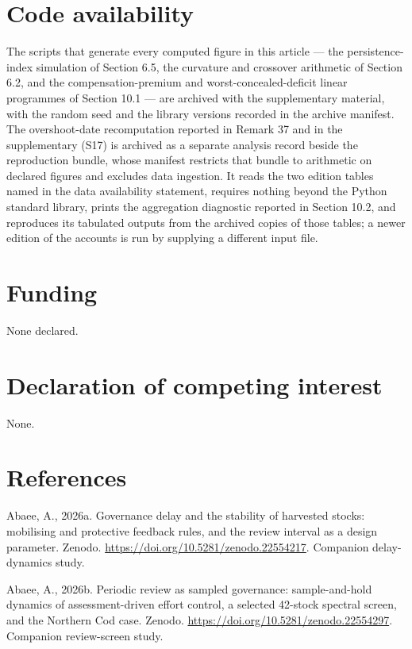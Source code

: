 \documentclass[11pt]{article}
\begin{document}
\section*{Code availability}\label{code-availability}

The scripts that generate every computed figure in this article --- the persistence-index simulation of Section 6.5, the curvature and crossover arithmetic of Section 6.2, and the compensation-premium and worst-concealed-deficit linear programmes of Section 10.1 --- are archived with the supplementary material, with the random seed and the library versions recorded in the archive manifest. The overshoot-date recomputation reported in Remark 37 and in the supplementary (S17) is archived as a separate analysis record beside the reproduction bundle, whose manifest restricts that bundle to arithmetic on declared figures and excludes data ingestion. It reads the two edition tables named in the data availability statement, requires nothing beyond the Python standard library, prints the aggregation diagnostic reported in Section 10.2, and reproduces its tabulated outputs from the archived copies of those tables; a newer edition of the accounts is run by supplying a different input file.

\section*{Funding}\label{funding}

None declared.

\section*{Declaration of competing interest}\label{declaration-of-competing-interest}

None.

\vspace{0.8em}

\section*{References}\label{references}

Abaee, A., 2026a. Governance delay and the stability of harvested stocks: mobilising and protective feedback rules, and the review interval as a design parameter. Zenodo. \url{https://doi.org/10.5281/zenodo.22554217}. Companion delay-dynamics study.

Abaee, A., 2026b. Periodic review as sampled governance: sample-and-hold dynamics of assessment-driven effort control, a selected 42-stock spectral screen, and the Northern Cod case. Zenodo. \url{https://doi.org/10.5281/zenodo.22554297}. Companion review-screen study.
\end{document}
